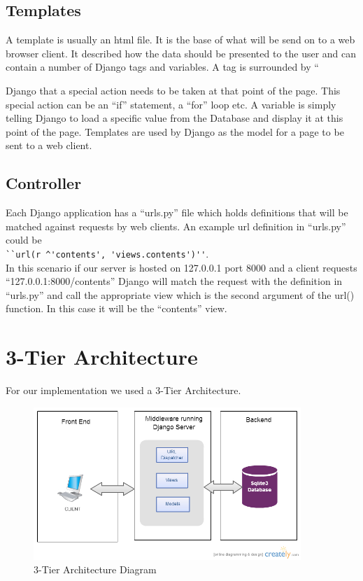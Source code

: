 \documentclass{l3proj}
\begin{document}
\subsection{Templates}
A template is usually an html file. It is the base of what will be send on to a web browser 
client. It described how the data should be presented to the user and can contain a 
number of Django tags and variables. A tag is surrounded by ``{%
Django that a special action needs to be taken at that point of the page. This special 
action can be an ``if'' statement, a ``for'' loop etc. A variable is simply telling Django to load 
a specific value from the Database and display it at this point of the page. Templates are 
used by Django as the model for a page to be sent to a web client.
\subsection{Controller}
Each Django application has a ``urls.py'' file which holds definitions that will be matched 
against requests by web clients. An example url definition in ``urls.py'' could be \\
\verb|``url(r ^'contents', 'views.contents')''|. \\In this scenario if our server is hosted on 127.0.0.1 
port 8000 and a client requests ``127.0.0.1:8000/contents'' Django will match the 
request with the definition in ``urls.py'' and call the appropriate view which is the second 
argument of the url() function. In this case it will be the ``contents'' view.
\section{3-Tier Architecture}
For our implementation we used a 3-Tier Architecture.
\begin{figure}[!htb]
\caption{3-Tier Architecture Diagram}
 \centering
\includegraphics[width=0.9\textwidth]{images/ntier.jpg}
\end{figure}
}
\end{document}
